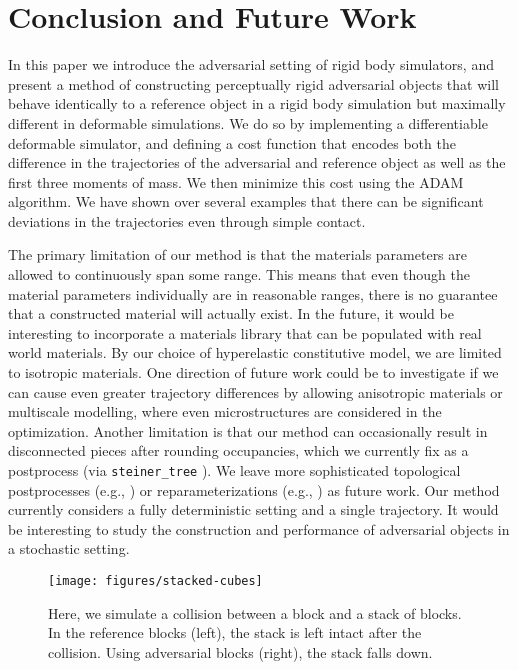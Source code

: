 \section{Conclusion and Future Work} \label{sec:conclusion}
In this paper we introduce the adversarial setting of rigid body simulators, and present a method of constructing perceptually rigid adversarial objects that will behave identically to a reference object in a rigid body simulation but maximally different in deformable simulations. We do so by implementing a differentiable deformable simulator, and defining a cost function that encodes both the difference in the trajectories of the adversarial and reference object as well as the first three moments of mass. We then minimize this cost using the ADAM algorithm. We have shown over several examples that there can be significant deviations in the trajectories even through simple contact. 

The primary limitation of our method is that the materials parameters are allowed to continuously span some range. This means that even though the material parameters individually are in reasonable ranges, there is no guarantee that a constructed material will actually exist. In the future, it would be interesting to incorporate a materials library that can be populated with real world materials. By our choice of hyperelastic constitutive model, we are limited to isotropic materials. One direction of future work could be to investigate if we can cause even greater trajectory differences by allowing anisotropic materials or multiscale modelling, where even microstructures are considered in the optimization. Another limitation is that our method can occasionally result in disconnected pieces after rounding occupancies, which we currently fix as a postprocess (via \texttt{steiner\_tree} \cite{networkx}). We leave more sophisticated topological postprocesses (e.g., \cite{joining-cv}) or reparameterizations (e.g., \cite{fast-quasi-harmonic}) as future work. Our method currently considers a fully deterministic setting and a single trajectory. It would be interesting to study the construction and performance of adversarial objects in a stochastic setting.
%
\begin{figure}[t]
	\texttt{[image: figures/stacked-cubes]}
	\vspace{-0.7cm}
 \caption{Here, we simulate a collision between a block and a stack of blocks. In the reference blocks (left), the stack is left intact after the collision. Using adversarial blocks (right), the stack falls down.} 
	 \label{fig:stacking}
\end{figure}
%

